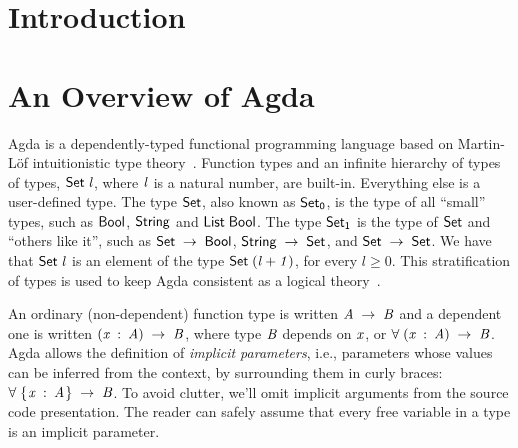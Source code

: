 \documentclass[sigconf]{acmart}
\theoremstyle{definition}
\renewcommand{\geq}{\geqslant}
\newcommand{\D}[1]{\blue{\mathsf{#1}}}
\newcommand{\V}[1]{\purple{\mathit{#1}}}
\begin{document}


\maketitle



\section{Introduction}

\section{An Overview of Agda}\label{sec:agda}

Agda is a dependently-typed functional programming language based on
Martin-L\"of intuitionistic type theory~\cite{Lof98}.  Function types
and an infinite hierarchy of types of types, \ensuremath{\D{Set}\;\V{l}}, where \ensuremath{\V{l}} is a
natural number, are built-in. Everything else is a user-defined
type. The type \ensuremath{\D{Set}}, also known as \ensuremath{\D{Set}_{\D{0}}}, is the type of all
``small'' types, such as \ensuremath{\D{Bool}}, \ensuremath{\D{String}} and \ensuremath{\D{List}\;\D{Bool}}.  The type
\ensuremath{\D{Set}_{\D{1}}} is the type of \ensuremath{\D{Set}} and ``others like it'', such as \ensuremath{\D{Set}\;\to \;\D{Bool}}, \ensuremath{\D{String}\;\to \;\D{Set}}, and \ensuremath{\D{Set}\;\to \;\D{Set}}. We have that \ensuremath{\D{Set}\;\V{l}} is an
element of the type \ensuremath{\D{Set}\;(\V{l+1})}, for every $l \geq 0$. This
stratification of types is used to keep Agda consistent as a logical
theory~\cite{Sorensen2006}.

An ordinary (non-dependent) function type is written \ensuremath{\V{A}\;\to \;\V{B}} and a
dependent one is written \ensuremath{(\V{x}\;\mathbin{:}\;\V{A})\;\to \;\V{B}}, where type \ensuremath{\V{B}} depends on
\ensuremath{\V{x}}, or \ensuremath{\D{\forall}\;(\V{x}\;\mathbin{:}\;\V{A})\;\to \;\V{B}}. Agda allows the definition of \emph{implicit
parameters}, i.e.,  parameters whose values can be inferred from the
context, by surrounding them in curly braces: \ensuremath{\D{\forall}\;\{\mskip1.5mu \V{x}\;\mathbin{:}\;\V{A}\mskip1.5mu\}\;\to \;\V{B}}. To
avoid clutter, we'll omit implicit arguments from the source code
presentation. The reader can safely assume that every free variable in
a type is an implicit parameter.
\end{document}
